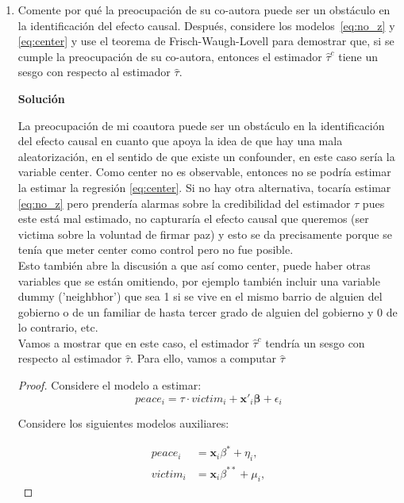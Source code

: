 \documentclass[a4paper, answers, addpoints, 11pt]{exam}
\newenvironment{solucion}{%
  \begin{mdframed}[
    backgroundcolor=blue!5,    %
    linecolor=blue!50,          %
    linewidth=2pt,              %
    leftmargin=10pt,            %
    rightmargin=10pt,           %
    topline=true,              %
    bottomline=true,            %
    roundcorner=10pt,           %
    innerleftmargin=10pt,       %
    innerrightmargin=10pt,      %
    innerbottommargin=10pt,     %
    innertopmargin=10pt         %
  ]%
  \begin{tcolorbox}[colframe=blue!50!black, colback=blue!50, coltitle=white, sharp corners=all, boxrule=1mm, width=\textwidth, halign=left, valign=center, top=0mm, bottom=0mm, left=0mm, right=0mm] \textbf{Solución} \end{tcolorbox} }{\end{mdframed}}
\begin{document}
\begin{enumerate} [resume]
    \item Comente por qué la preocupación de su co-autora puede ser un obstáculo en la identificación del efecto causal. Después, considere los modelos~\eqref{eq:no_z} y \eqref{eq:center} y use el teorema de Frisch-Waugh-Lovell para demostrar que, si se cumple la preocupación de su co-autora, entonces el estimador $\hat\tau^c$ tiene un sesgo con respecto al estimador $\hat\tau$.

  \begin{solucion}
        
        La preocupación de mi coautora puede ser un obstáculo en la identificación del efecto causal en cuanto que apoya la idea de que hay una mala aleatorización, en el sentido de que existe un confounder, en este caso sería la variable center. Como center no es observable, entonces no se podría estimar la  estimar la regresión \eqref{eq:center}. Si no hay otra alternativa, tocaría estimar \ref{eq:no_z} pero prendería alarmas sobre la credibilidad del estimador $\tau$ pues este está mal estimado, no capturaría el efecto causal que queremos (ser victima sobre la voluntad de firmar paz) y esto se da precisamente porque se tenía que meter center como control pero no fue posible. \\
        Esto también abre la discusión a que así como center, puede haber otras variables que se están omitiendo, por ejemplo también incluir una variable dummy ('neighbhor') que sea 1 si se vive en el mismo barrio de alguien del gobierno o de un familiar de hasta tercer grado de alguien del gobierno y 0 de lo contrario, etc.\\
        
    Vamos a mostrar que en este caso, el estimador  $\hat\tau^c$ tendría un sesgo con respecto al estimador $\hat\tau$. Para ello, vamos a computar $\hat\tau$
    \begin{proof}
Considere el modelo a estimar:
\begin{equation*} 
    peace_i = \tau \cdot victim_i + \textbf{x}'_i\boldsymbol\beta + \epsilon_i
\end{equation*}

Considere los siguientes modelos auxiliares:

\begin{align*}
    peace_i &= \textbf{x}_i \beta^{*} + \eta_i, \\
    victim_i &= \textbf{x}_i\beta^{**} + \mu_i,
\end{align*}


\end{proof}
\end{solucion}
\end{enumerate}
\end{document}
